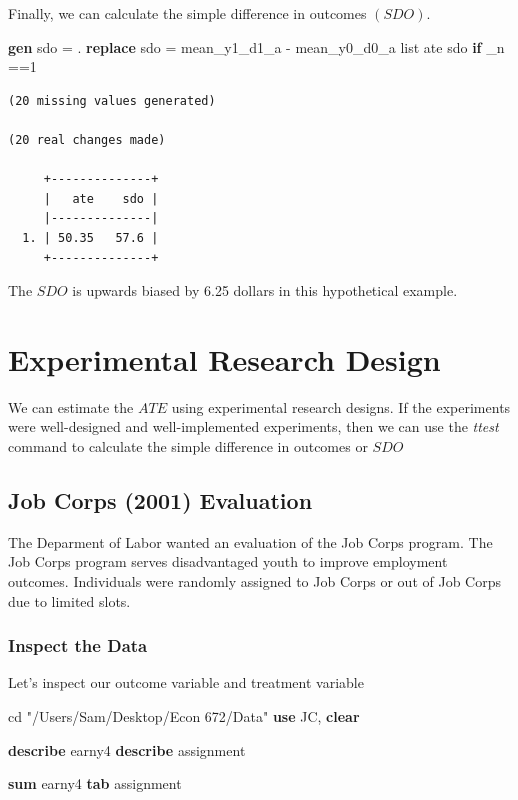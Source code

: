 \documentclass[
]{book}
\newenvironment{Shaded}{\begin{snugshade}}{\end{snugshade}}
\newcommand{\DataTypeTok}[1]{\textcolor[rgb]{0.13,0.29,0.53}{#1}}
\newcommand{\KeywordTok}[1]{\textcolor[rgb]{0.13,0.29,0.53}{\textbf{#1}}}
\newcommand{\NormalTok}[1]{#1}
\newcommand{\OtherTok}[1]{\textcolor[rgb]{0.56,0.35,0.01}{#1}}
\newcommand{\StringTok}[1]{\textcolor[rgb]{0.31,0.60,0.02}{#1}}
\begin{document}
Finally, we can calculate the simple difference in outcomes \((SDO)\).

\begin{Shaded}
\begin{Highlighting}[]
\KeywordTok{gen}\NormalTok{ sdo = .}
\KeywordTok{replace}\NormalTok{ sdo = mean\_y1\_d1\_a {-} mean\_y0\_d0\_a}
\OtherTok{list}\NormalTok{ ate sdo }\KeywordTok{if} \DataTypeTok{\_n}\NormalTok{ ==1}
\end{Highlighting}
\end{Shaded}

\begin{verbatim}
(20 missing values generated)

(20 real changes made)

     +--------------+
     |   ate    sdo |
     |--------------|
  1. | 50.35   57.6 |
     +--------------+
\end{verbatim}

The \(SDO\) is upwards biased by 6.25 dollars in this hypothetical example.

\chapter{Experimental Research Design}\label{experimental-research-design}

We can estimate the \(ATE\) using experimental research designs. If the experiments were well-designed and well-implemented experiments, then we can use the \emph{ttest} command to calculate the simple difference in outcomes or \(SDO\)

\section{Job Corps (2001) Evaluation}\label{job-corps-2001-evaluation}

The Deparment of Labor wanted an evaluation of the Job Corps program. The Job Corps program serves disadvantaged youth to improve employment outcomes. Individuals were randomly assigned to Job Corps or out of Job Corps due to limited slots.

\subsection{Inspect the Data}\label{inspect-the-data}

Let's inspect our outcome variable and treatment variable

\begin{Shaded}
\begin{Highlighting}[]
\NormalTok{cd }\StringTok{"/Users/Sam/Desktop/Econ 672/Data"}
\KeywordTok{use}\NormalTok{ JC, }\KeywordTok{clear}

\KeywordTok{describe}\NormalTok{ earny4}
\KeywordTok{describe}\NormalTok{ assignment}

\KeywordTok{sum}\NormalTok{ earny4}
\KeywordTok{tab}\NormalTok{ assignment}
\end{Highlighting}
\end{Shaded}
\end{document}
